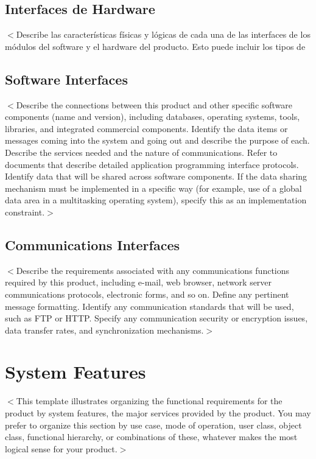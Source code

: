 \documentclass{scrreprt}
\begin{document}
\section{Interfaces de Hardware}
$<$Describe las características físicas y lógicas de cada una de las interfaces de los módulos del software y el hardware del producto. Esto puede incluir los tipos de 

\section{Software Interfaces}
$<$Describe the connections between this product and other specific software 
components (name and version), including databases, operating systems, tools, 
libraries, and integrated commercial components. Identify the data items or 
messages coming into the system and going out and describe the purpose of each.  
Describe the services needed and the nature of communications. Refer to 
documents that describe detailed application programming interface protocols.  
Identify data that will be shared across software components. If the data 
sharing mechanism must be implemented in a specific way (for example, use of a 
global data area in a multitasking operating system), specify this as an 
implementation constraint.$>$

\section{Communications Interfaces}
$<$Describe the requirements associated with any communications functions 
required by this product, including e-mail, web browser, network server 
communications protocols, electronic forms, and so on. Define any pertinent 
message formatting. Identify any communication standards that will be used, such 
as FTP or HTTP. Specify any communication security or encryption issues, data 
transfer rates, and synchronization mechanisms.$>$


\chapter{System Features}
$<$This template illustrates organizing the functional requirements for the 
product by system features, the major services provided by the product. You may 
prefer to organize this section by use case, mode of operation, user class, 
object class, functional hierarchy, or combinations of these, whatever makes the 
most logical sense for your product.$>$
\end{document}
